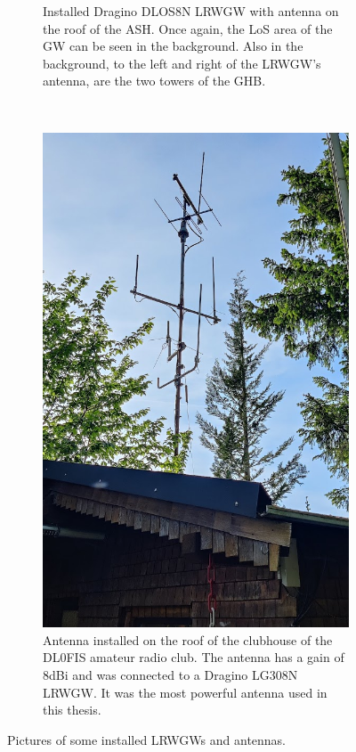 \begin{figure}
\begin{subfigure}[t]{0.5\textwidth}
        \caption[Dragino DLOS8N \acl{LRWGW} with antenna on the roof of the \acl{ASH}]{
            Installed Dragino DLOS8N \acl{LRWGW} with antenna on the roof of the \ac{ASH}.
            Once again, the \ac{LoS} area of the \acl{GW} can be seen in the background.
            Also in the background, to the left and right of the \acl{LRWGW}'s antenna, are the two towers of the \ac{GHB}.
        }\label{pic:dragino-gateway-ash}
    \end{subfigure}%
    ~
    \begin{subfigure}[t]{0.5\textwidth}
        \centering
        \includegraphics[width=1\textwidth]{pictures/hardware/gateway-deployment/gateway_dl0fis_clubhouse.jpg}
        \caption[Antenna installed on the roof of the clubhouse of the DL0FIS amateur radio club]{
            Antenna installed on the roof of the clubhouse of the DL0FIS amateur radio club.
            The antenna has a gain of 8dBi and was connected to a Dragino LG308N \acl{LRWGW}.
            It was the most powerful antenna used in this thesis.
        }\label{pic:antenna-dl0fis-clubhouse}
    \end{subfigure}

    \caption{Pictures of some installed \aclp{LRWGW} and antennas.}
\end{figure}

